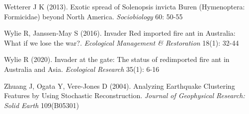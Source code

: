 \documentclass[11pt,a4paper]{article}
\begin{document}
\begin{thebibliography}{99}
 Wetterer J K (2013). Exotic spread of Solenopsis invicta Buren (Hymenoptera: Formicidae) beyond North America. \textit{Sociobiology} 60: 50-55

 Wylie R, Janssen-May S (2016). Invader  Red imported fire ant in Australia:  What if we lose the war?. \textit{Ecological Management & Restoration} 18(1): 32-44

 Wylie R (2020). Invader at the gate: The status of redimported fire ant in Australia and Asia. \textit{Ecological Research} 35(1): 6-16

 Zhuang J, Ogata Y, Vere-Jones D (2004). Analyzing Earthquake Clustering Features by Using Stochastic Reconstruction. \textit{Journal of Geophysical Research: Solid Earth} 109(B05301)

\end{thebibliography}
\end{document}
